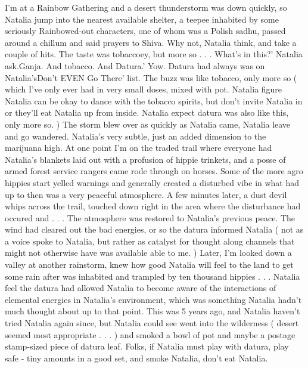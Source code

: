\documentclass[12pt]{book}
\begin{document}
I'm at a Rainbow Gathering and a desert thunderstorm was  down quickly, so Natalia jump into the nearest available shelter, a teepee inhabited by some seriously Rainbowed-out characters, one of whom was a Polish sadhu, passed around a chillum and said prayers to Shiva. Why not, Natalia think, and take a couple of hits. The taste was tobaccoey, but more so . . . What's in this?' Natalia ask.Ganja. And tobacco. And Datura.' Yow. Datura had always was on Natalia'sDon't EVEN Go There' list. The buzz was like tobacco, only more so ( which I've only ever had in very small doses, mixed with pot. Natalia figure Natalia can be okay to dance with the tobacco spirits, but don't invite Natalia in or they'll eat Natalia up from inside. Natalia expect datura was also like this, only more so. ) The storm blew over as quickly as Natalia came, Natalia leave and go wandered. Natalia's very subtle, just an added dimension to the marijuana high. At one point I'm on the traded trail where everyone had Natalia's blankets laid out with a profusion of hippie trinkets, and a posse of armed forest service rangers came rode through on horses. Some of the more agro hippies start yelled warnings and generally created a disturbed vibe in what had up to then was a very peaceful atmosphere. A few minutes later, a dust devil whips across the trail, touched down right in the area where the disturbance had occured and . . .  The atmosphere was restored to Natalia's previous peace. The wind had cleared out the bad energies, or so the datura informed Natalia ( not as a voice spoke to Natalia, but rather as catalyst for thought along channels that might not otherwise have was available able to me. ) Later, I'm looked down a valley at another rainstorm, knew how good Natalia will feel to the land to get some rain after was inhabited and trampled by ten thousand hippies . . .  Natalia feel the datura had allowed Natalia to become aware of the interactions of elemental energies in Natalia's environment, which was something Natalia hadn't much thought about up to that point. This was 5 years ago, and Natalia haven't tried Natalia again since, but Natalia could see went into the wilderness ( desert seemed most appropriate . . .   ) and smoked a bowl of pot and maybe a postage stamp-sized piece of datura leaf. Folks, if Natalia must play with datura, play safe - tiny amounts in a good set, and smoke Natalia, don't eat Natalia.
\end{document}
